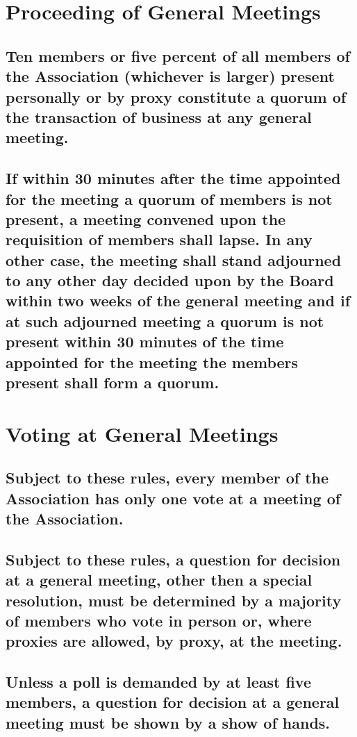 \documentclass{article}
\newenvironment{subs}
  {\adjustwidth{2em}{0pt}}
  {\endadjustwidth}
\begin{document}
\section{Proceeding of General Meetings}
\begin{subs}
\subsection{Ten members or five percent of all members of the Association (whichever is larger) present personally or by proxy constitute a quorum of the transaction of business at any general meeting.}
\subsection{If within 30 minutes after the time appointed for the meeting a quorum of members is not present, a meeting convened upon the requisition of members shall lapse. In any other case, the meeting shall stand adjourned to any other day decided upon by the Board within two weeks of the general meeting and if at such adjourned meeting a quorum is not present within 30 minutes of the time appointed for the meeting the members present shall form a quorum.}
\end{subs}

\section{Voting at General Meetings}
\begin{subs}
\subsection{Subject to these rules, every member of the Association has only one vote at a meeting of the Association.}
\subsection{Subject to these rules, a question for decision at a general meeting, other then a special resolution, must be determined by a majority of members who vote in person or, where proxies are allowed, by proxy, at the meeting.}
\newpage

\subsection{Unless a poll is demanded by at least five members, a question for decision at a general meeting must be shown by a show of hands.}
\end{subs}
\end{document}
